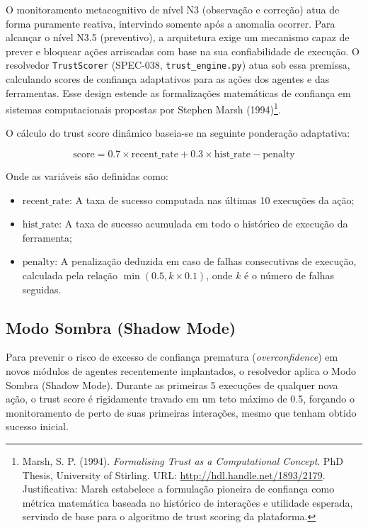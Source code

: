 \documentclass[12pt,a4paper,oneside]{abntex2}
\begin{document}
O monitoramento metacognitivo de nível N3 (observação e correção) atua de forma puramente reativa, intervindo somente após a anomalia ocorrer. Para alcançar o nível N3.5 (preventivo), a arquitetura exige um mecanismo capaz de prever e bloquear ações arriscadas com base na sua confiabilidade de execução. O resolvedor \texttt{TrustScorer} (SPEC-038, \texttt{trust\_engine.py}) atua sob essa premissa, calculando scores de confiança adaptativos para as ações dos agentes e das ferramentas. Esse design estende as formalizações matemáticas de confiança em sistemas computacionais propostas por Stephen Marsh (1994)\footnote{Marsh, S. P. (1994). \textit{Formalising Trust as a Computational Concept}. PhD Thesis, University of Stirling. URL: \href{http://hdl.handle.net/1893/2179}{http://hdl.handle.net/1893/2179}. Justificativa: Marsh estabelece a formulação pioneira de confiança como métrica matemática baseada no histórico de interações e utilidade esperada, servindo de base para o algoritmo de trust scoring da plataforma.}.

O cálculo do trust score dinâmico baseia-se na seguinte ponderação adaptativa:

\begin{equation}
\text{score} = 0.7 \times \text{recent\_rate} + 0.3 \times \text{hist\_rate} - \text{penalty}
\end{equation}

Onde as variáveis são definidas como:
\begin{itemize}
    \item $\text{recent\_rate}$: A taxa de sucesso computada nas últimas 10 execuções da ação;
    \item $\text{hist\_rate}$: A taxa de sucesso acumulada em todo o histórico de execução da ferramenta;
    \item $\text{penalty}$: A penalização deduzida em caso de falhas consecutivas de execução, calculada pela relação $\min(0.5, k \times 0.1)$, onde $k$ é o número de falhas seguidas.
\end{itemize}

\subsection{Modo Sombra (Shadow Mode)}

Para prevenir o risco de excesso de confiança prematura (\textit{overconfidence}) em novos módulos de agentes recentemente implantados, o resolvedor aplica o Modo Sombra (Shadow Mode). Durante as primeiras 5 execuções de qualquer nova ação, o trust score é rigidamente travado em um teto máximo de 0.5, forçando o monitoramento de perto de suas primeiras interações, mesmo que tenham obtido sucesso inicial.
\end{document}
